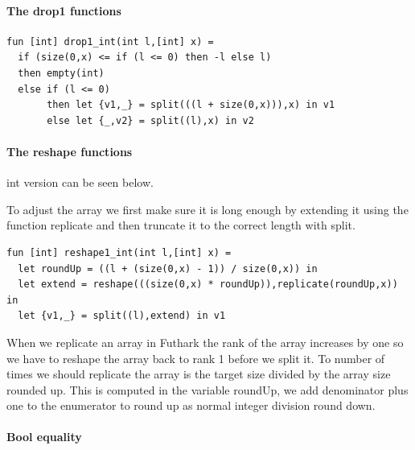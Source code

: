 \documentclass[11pt]{article}
\begin{document}
\paragraph{The drop1 functions}

\begin{lstlisting}[language=Futhark]
fun [int] drop1_int(int l,[int] x) =
  if (size(0,x) <= if (l <= 0) then -l else l)
  then empty(int)
  else if (l <= 0)
       then let {v1,_} = split(((l + size(0,x))),x) in v1
       else let {_,v2} = split((l),x) in v2
\end{lstlisting}

\paragraph{The reshape functions} int version can be seen below. 

To adjust the array we first make sure it is long enough by extending it using the function replicate and then
truncate it to the correct length with split.

\begin{lstlisting}[language=Futhark]
fun [int] reshape1_int(int l,[int] x) =
  let roundUp = ((l + (size(0,x) - 1)) / size(0,x)) in
  let extend = reshape(((size(0,x) * roundUp)),replicate(roundUp,x)) in
  let {v1,_} = split((l),extend) in v1
\end{lstlisting}

When we replicate an array in Futhark the rank of the array increases by one so we have to reshape the array back to rank 1 before
we split it. To number of times we should replicate the array is the target size divided by the array size rounded up.
This is computed in the variable roundUp, we add denominator plus one to the enumerator to round up as normal integer division
round down.


\paragraph{Bool equality}
\end{document}
